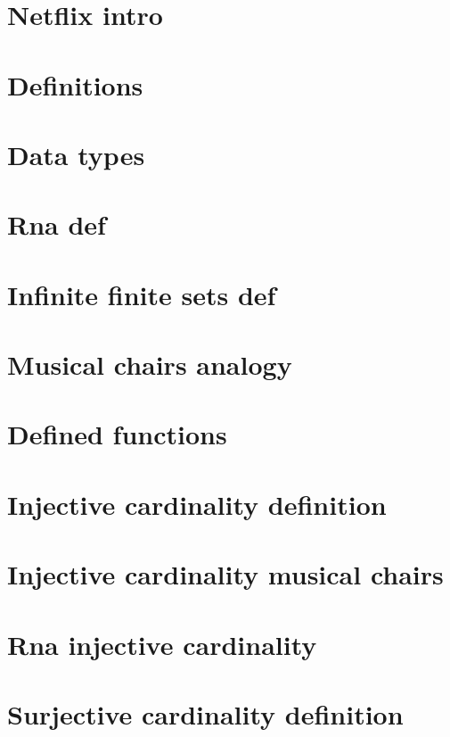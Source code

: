 
\section*{Netflix intro}

\vfill
\section*{Definitions}

\vfill
\section*{Data types}

\vfill
\section*{Rna def}

\vfill
\section*{Infinite finite sets def}

\vfill
\section*{Musical chairs analogy}

\vfill
\section*{Defined functions}

\vfill
\section*{Injective cardinality definition}

\vfill
\section*{Injective cardinality musical chairs}

\vfill
\section*{Rna injective cardinality}

\vfill
\section*{Surjective cardinality definition}

\vfill
